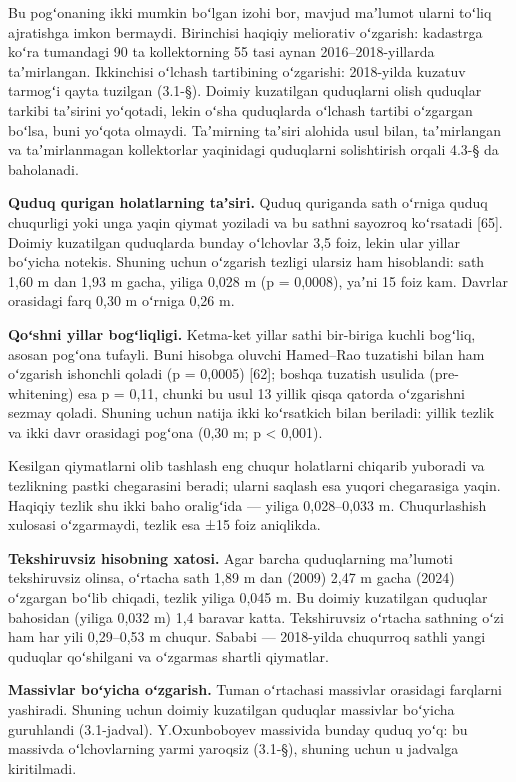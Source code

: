 Bu pogʻonaning ikki mumkin boʻlgan izohi bor, mavjud maʼlumot ularni
toʻliq ajratishga imkon bermaydi. Birinchisi haqiqiy meliorativ
oʻzgarish: kadastrga koʻra tumandagi 90 ta kollektorning 55 tasi aynan
2016--2018-yillarda taʼmirlangan. Ikkinchisi oʻlchash tartibining
oʻzgarishi: 2018-yilda kuzatuv tarmogʻi qayta tuzilgan (3.1-§). Doimiy
kuzatilgan quduqlarni olish quduqlar tarkibi taʼsirini yoʻqotadi, lekin
oʻsha quduqlarda oʻlchash tartibi oʻzgargan boʻlsa, buni yoʻqota
olmaydi. Taʼmirning taʼsiri alohida usul bilan, taʼmirlangan va
taʼmirlanmagan kollektorlar yaqinidagi quduqlarni solishtirish orqali
4.3-§ da baholanadi.

\textbf{Quduq qurigan holatlarning taʼsiri.} Quduq quriganda sath
oʻrniga quduq chuqurligi yoki unga yaqin qiymat yoziladi va bu sathni
sayozroq koʻrsatadi {[}65{]}. Doimiy kuzatilgan quduqlarda bunday
oʻlchovlar 3,5 foiz, lekin ular yillar boʻyicha notekis. Shuning uchun
oʻzgarish tezligi ularsiz ham hisoblandi: sath 1,60 m dan 1,93 m gacha,
yiliga 0,028 m (p = 0,0008), yaʼni 15 foiz kam. Davrlar orasidagi farq
0,30 m oʻrniga 0,26 m.

\textbf{Qoʻshni yillar bogʻliqligi.} Ketma-ket yillar sathi bir-biriga
kuchli bogʻliq, asosan pogʻona tufayli. Buni hisobga oluvchi Hamed--Rao
tuzatishi bilan ham oʻzgarish ishonchli qoladi (p = 0,0005) {[}62{]};
boshqa tuzatish usulida (pre-whitening) esa p = 0,11, chunki bu usul 13
yillik qisqa qatorda oʻzgarishni sezmay qoladi. Shuning uchun natija
ikki koʻrsatkich bilan beriladi: yillik tezlik va ikki davr orasidagi
pogʻona (0,30 m; p \textless{} 0,001).

Kesilgan qiymatlarni olib tashlash eng chuqur holatlarni chiqarib
yuboradi va tezlikning pastki chegarasini beradi; ularni saqlash esa
yuqori chegarasiga yaqin. Haqiqiy tezlik shu ikki baho oraligʻida ---
yiliga 0,028--0,033 m. Chuqurlashish xulosasi oʻzgarmaydi, tezlik esa
±15 foiz aniqlikda.

\textbf{Tekshiruvsiz hisobning xatosi.} Agar barcha quduqlarning
maʼlumoti tekshiruvsiz olinsa, oʻrtacha sath 1,89 m dan (2009) 2,47 m
gacha (2024) oʻzgargan boʻlib chiqadi, tezlik yiliga 0,045 m. Bu doimiy
kuzatilgan quduqlar bahosidan (yiliga 0,032 m) 1,4 baravar katta.
Tekshiruvsiz oʻrtacha sathning oʻzi ham har yili 0,29--0,53 m chuqur.
Sababi --- 2018-yilda chuqurroq sathli yangi quduqlar qoʻshilgani va
oʻzgarmas shartli qiymatlar.

\textbf{Massivlar boʻyicha oʻzgarish.} Tuman oʻrtachasi massivlar
orasidagi farqlarni yashiradi. Shuning uchun doimiy kuzatilgan quduqlar
massivlar boʻyicha guruhlandi (3.1-jadval). Y.Oxunboboyev massivida
bunday quduq yoʻq: bu massivda oʻlchovlarning yarmi yaroqsiz (3.1-§),
shuning uchun u jadvalga kiritilmadi.

